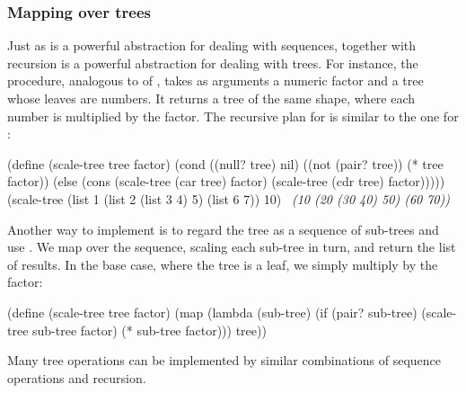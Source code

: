\subsubsection*{Mapping over trees}

Just as  is a powerful abstraction for dealing with sequences,
 together with recursion is a powerful abstraction for dealing with
trees.  For instance, the  procedure, analogous to
 of , takes as arguments a numeric factor
and a tree whose leaves are numbers.  It returns a tree of the same shape,
where each number is multiplied by the factor.  The recursive plan for
 is similar to the one for :

\begin{codeBlock}
(define (scale-tree tree factor)
  (cond ((null? tree) nil)
        ((not (pair? tree)) (* tree factor))
        (else (cons (scale-tree (car tree) factor)
                    (scale-tree (cdr tree) factor)))))
(scale-tree (list 1 (list 2 (list 3 4) 5) (list 6 7))
            10)
~\textit{(10 (20 (30 40) 50) (60 70))}~
\end{codeBlock}

\noindent
Another way to implement  is to regard the tree as a sequence
of sub-trees and use .  We map over the sequence, scaling each
sub-tree in turn, and return the list of results.  In the base case, where the
tree is a leaf, we simply multiply by the factor:

\begin{codeBlock}
(define (scale-tree tree factor)
  (map (lambda (sub-tree)
         (if (pair? sub-tree)
             (scale-tree sub-tree factor)
             (* sub-tree factor)))
       tree))
\end{codeBlock}

\noindent
Many tree operations can be implemented by similar combinations of sequence
operations and recursion.

